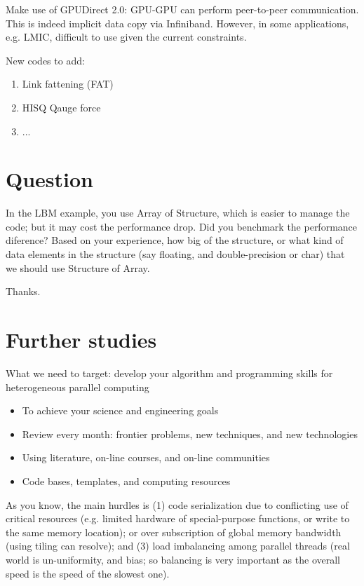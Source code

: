 Make use of GPUDirect 2.0: GPU-GPU can perform peer-to-peer
communication. This is indeed implicit data copy via
Infiniband. However, in some applications, e.g. LMIC, difficult to use
given the current constraints. 

New codes to add:
\begin{enumerate}
\item Link fattening (FAT)
\item HISQ Qauge force
\item ...
\end{enumerate}


\section{Question}
\label{sec:question}

In the LBM example, you use Array of Structure, which is easier to
manage the code; but it may cost the performance drop. Did you
benchmark the performance diference? Based on your experience, how big
of the structure, or what kind of data elements in the structure (say
floating, and double-precision or char) that we should use Structure
of Array.

Thanks.


\section{Further studies}
\label{sec:further-studies}

What we need to target: develop your algorithm and programming skills
for heterogeneous parallel computing
\begin{itemize}
\item To achieve your science and engineering goals
\item Review every month: frontier problems, new techniques, and new
  technologies
\item Using literature, on-line courses, and on-line communities
\item Code bases, templates, and computing resources
\end{itemize}

As you know, the main hurdles is (1) code serialization due to
conflicting use of critical resources (e.g. limited hardware of
special-purpose functions, or write to the same memory location); or
over subscription of global memory bandwidth (using tiling can
resolve); and (3) load imbalancing among parallel threads (real world
is un-uniformity, and bias; so balancing is very important as the
overall speed is the speed of the slowest one).

